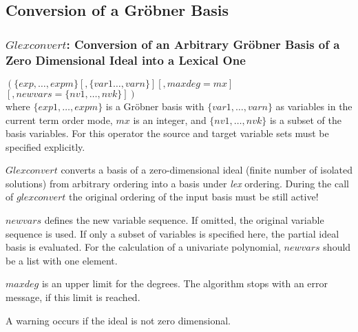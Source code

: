 \subsection{Conversion of a Gr\"obner Basis}

\subsubsection{$Glexconvert$: Conversion of an Arbitrary Gr\"obner Basis
of a Zero Dimensional Ideal into a Lexical One}
\begin{description}
\item[{\it glexconvert}] $ \left(\{exp,\ldots , expm\} \left[,\{var1
\ldots , varn\}\right]\left[,maxdeg=mx\right]\right.$ \\
$\left.\left[,newvars=\{nv1, \ldots , nvk\}\right]\right) $ \\
where $\{exp1, \ldots , expm\}$ is a Gr\"obner basis with
$\{var1, \ldots , varn\}$ as variables in the current term order mode,
$mx$ is an integer, and
$\{nv1, \ldots , nvk\}$ is a subset of the basis variables.
For this operator the source and target variable sets must be specified
explicitly.
\end{description}

$Glexconvert$ converts a basis of a zero-dimensional ideal (finite number
of isolated solutions) from arbitrary ordering into a basis under {\it
lex} ordering. During the call of $glexconvert$ the original ordering of
the input basis must be still active!

$newvars$ defines the new variable sequence. If omitted, the
original variable sequence is used. If only a subset of variables is
specified here, the partial ideal basis is evaluated. For the
calculation of a univariate polynomial, $new$\-$vars$ should be a list
with one element.

$maxdeg$ is an upper limit for the degrees. The algorithm stops with
an error message, if this limit is reached.

A warning occurs if the ideal is not zero dimensional.

